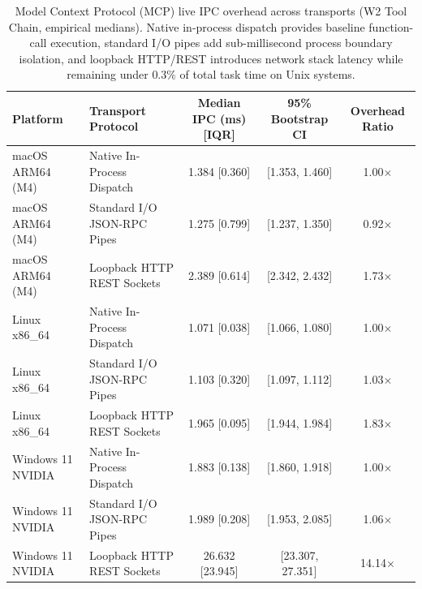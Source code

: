 \begin{table}[t]
\centering
\small
\caption{Model Context Protocol (MCP) live IPC overhead across transports (W2 Tool Chain, empirical medians). Native in-process dispatch provides baseline function-call execution, standard I/O pipes add sub-millisecond process boundary isolation, and loopback HTTP/REST introduces network stack latency while remaining under $0.3\%$ of total task time on Unix systems.}
\label{tab:mcp_transport_ablation}
\begin{tabular}{llccc}
\toprule
\textbf{Platform} & \textbf{Transport Protocol} & \textbf{Median IPC (ms) [IQR]} & \textbf{95\% Bootstrap CI} & \textbf{Overhead Ratio} \\
\midrule
macOS ARM64 (M4) & Native In-Process Dispatch & 1.384 [0.360] & [1.353, 1.460] & 1.00$\times$ \\
macOS ARM64 (M4) & Standard I/O JSON-RPC Pipes & 1.275 [0.799] & [1.237, 1.350] & 0.92$\times$ \\
macOS ARM64 (M4) & Loopback HTTP REST Sockets & 2.389 [0.614] & [2.342, 2.432] & 1.73$\times$ \\
\midrule
Linux x86_64 & Native In-Process Dispatch & 1.071 [0.038] & [1.066, 1.080] & 1.00$\times$ \\
Linux x86_64 & Standard I/O JSON-RPC Pipes & 1.103 [0.320] & [1.097, 1.112] & 1.03$\times$ \\
Linux x86_64 & Loopback HTTP REST Sockets & 1.965 [0.095] & [1.944, 1.984] & 1.83$\times$ \\
\midrule
Windows 11 NVIDIA & Native In-Process Dispatch & 1.883 [0.138] & [1.860, 1.918] & 1.00$\times$ \\
Windows 11 NVIDIA & Standard I/O JSON-RPC Pipes & 1.989 [0.208] & [1.953, 2.085] & 1.06$\times$ \\
Windows 11 NVIDIA & Loopback HTTP REST Sockets & 26.632 [23.945] & [23.307, 27.351] & 14.14$\times$ \\
\midrule
\bottomrule
\end{tabular}
\end{table}
